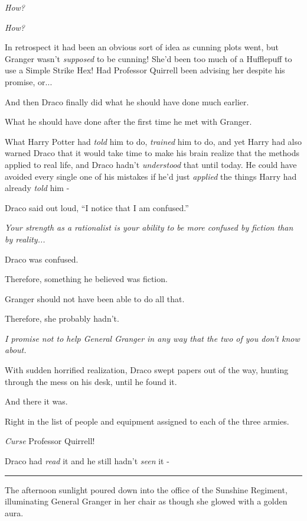 \emph{How?}

\emph{How?}

In retrospect it had been an obvious sort of idea as cunning plots went, but Granger wasn't \emph{supposed} to be cunning! She'd been too much of a Hufflepuff to use a Simple Strike Hex! Had Professor Quirrell been advising her despite his promise, or...

And then Draco finally did what he should have done much earlier.

What he should have done after the first time he met with Granger.

What Harry Potter had \emph{told} him to do, \emph{trained} him to do, and yet Harry had also warned Draco that it would take time to make his brain realize that the methods applied to real life, and Draco hadn't \emph{understood} that until today. He could have avoided every single one of his mistakes if he'd just \emph{applied} the things Harry had already \emph{told} him -

Draco said out loud, ``I notice that I am confused.''

\emph{Your strength as a rationalist is your ability to be more confused by fiction than by reality...}

Draco was confused.

Therefore, something he believed was fiction.

Granger should not have been able to do all that.

Therefore, she probably hadn't.

\emph{I promise not to help General Granger in any way that the two of you don't know about.}

With sudden horrified realization, Draco swept papers out of the way, hunting through the mess on his desk, until he found it.

And there it was.

Right in the list of people and equipment assigned to each of the three armies.

\emph{Curse} Professor Quirrell!

Draco had \emph{read} it and he still hadn't \emph{seen} it -

\begin{center}\rule{3in}{0.4pt}\end{center}

The afternoon sunlight poured down into the office of the Sunshine Regiment, illuminating General Granger in her chair as though she glowed with a golden aura.


